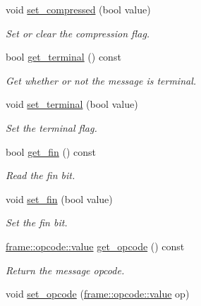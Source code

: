 \begin{DoxyCompactItemize}
void \hyperlink{classwebsocketpp_1_1message__buffer_1_1message_addf63a081902e981a293823606b548cb}{set\+\_\+compressed} (bool value)
\begin{DoxyCompactList}\small\item\em Set or clear the compression flag. \end{DoxyCompactList}\item 
bool \hyperlink{classwebsocketpp_1_1message__buffer_1_1message_a4ce9015aa105c18193958fbb0a970338}{get\+\_\+terminal} () const 
\begin{DoxyCompactList}\small\item\em Get whether or not the message is terminal. \end{DoxyCompactList}\item 
void \hyperlink{classwebsocketpp_1_1message__buffer_1_1message_abcc812dfce52ff72f57a0d0908d33867}{set\+\_\+terminal} (bool value)
\begin{DoxyCompactList}\small\item\em Set the terminal flag. \end{DoxyCompactList}\item 
bool \hyperlink{classwebsocketpp_1_1message__buffer_1_1message_a72ebb1fe2efd02d2a45085bcd4064adb}{get\+\_\+fin} () const 
\begin{DoxyCompactList}\small\item\em Read the fin bit. \end{DoxyCompactList}\item 
void \hyperlink{classwebsocketpp_1_1message__buffer_1_1message_ae726efab2bc95acf7a1fcd327a8e85b9}{set\+\_\+fin} (bool value)
\begin{DoxyCompactList}\small\item\em Set the fin bit. \end{DoxyCompactList}\item 
\hyperlink{namespacewebsocketpp_1_1frame_1_1opcode_ae68711643096dfc4af6d66ade3f9fd5e}{frame\+::opcode\+::value} \hyperlink{classwebsocketpp_1_1message__buffer_1_1message_a26ea226b8e4d6155095f5bb40752a583}{get\+\_\+opcode} () const 
\begin{DoxyCompactList}\small\item\em Return the message opcode. \end{DoxyCompactList}\item 
void \hyperlink{classwebsocketpp_1_1message__buffer_1_1message_a96571972bb7dfaf1ffcae2fbedb07bbe}{set\+\_\+opcode} (\hyperlink{namespacewebsocketpp_1_1frame_1_1opcode_ae68711643096dfc4af6d66ade3f9fd5e}{frame\+::opcode\+::value} op)

\end{DoxyCompactItemize}
